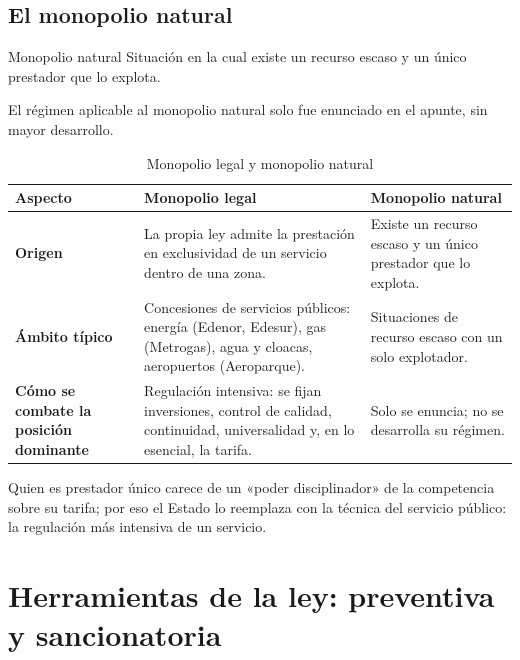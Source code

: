 \documentclass[12pt,oneside]{book}
\begin{document}
\subsection{El monopolio natural}

\begin{definition}{Monopolio natural}
Situación en la cual existe un recurso escaso y un único prestador que lo explota.
\end{definition}

El régimen aplicable al monopolio natural solo fue enunciado en el apunte, sin mayor desarrollo.

\begin{table}[H]
\centering
\small
\caption{Monopolio legal y monopolio natural}
\begin{tabularx}{\textwidth}{>{\raggedright\arraybackslash\bfseries}p{2.6cm} >{\raggedright\arraybackslash}X >{\raggedright\arraybackslash}X}
\toprule
Aspecto & Monopolio legal & Monopolio natural \\
\midrule
Origen & La propia ley admite la prestación en exclusividad de un servicio dentro de una zona. & Existe un recurso escaso y un único prestador que lo explota. \\
Ámbito típico & Concesiones de servicios públicos: energía (Edenor, Edesur), gas (Metrogas), agua y cloacas, aeropuertos (Aeroparque). & Situaciones de recurso escaso con un solo explotador. \\
Cómo se combate la posición dominante & Regulación intensiva: se fijan inversiones, control de calidad, continuidad, universalidad y, en lo esencial, la tarifa. & Solo se enuncia; no se desarrolla su régimen. \\
\bottomrule
\end{tabularx}
\end{table}

\begin{important}
Quien es prestador único carece de un «poder disciplinador» de la competencia sobre su tarifa; por eso el Estado lo reemplaza con la técnica del servicio público: la regulación más intensiva de un servicio.
\end{important}

\section{Herramientas de la ley: preventiva y sancionatoria}
\end{document}
